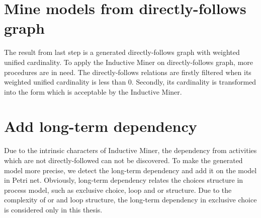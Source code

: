 \section{Mine models from directly-follows graph}
The result from last step is a generated directly-follows graph with weighted unified cardinality. To apply the Inductive Miner on directly-follows graph, more procedures are in need. The directly-follows relations are firstly filtered when its weighted unified cardinality is less than 0. Secondly, its cardinality is transformed into the form which is acceptable by the Inductive Miner.  

\section{Add long-term dependency}
Due to the intrinsic characters of Inductive Miner, the dependency from activities which are not directly-followed can not be discovered. 
To make the generated model  more precise, we detect the long-term dependency and add it on the model in Petri net. 
Obviously, long-term dependency relates the choices structure in process model, such as exclusive choice, loop and or structure. Due to the complexity of or and loop structure, the long-term dependency in exclusive choice is considered only in this thesis. 

